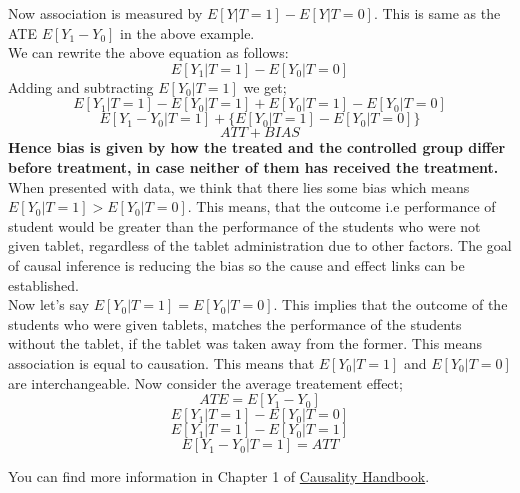 \documentclass{article}
\begin{document}
Now association is measured by $E[Y | T = 1] - E[Y | T = 0]$. This is same as the ATE $E[Y_1 - Y_0]$ in the above example.\\
We can rewrite the above equation as follows:\\
$$E[Y_1 | T = 1] - E[Y_0 | T = 0]$$
Adding and subtracting $E[Y_0 | T = 1]$ we get;\\
$$E[Y_1 | T = 1] - E[Y_0 | T = 1] + E[Y_0 | T = 1] - E[Y_0 | T = 0]$$
$$E[Y_1 - Y_0 | T = 1] + \{E[Y_0 | T = 1] - E[Y_0 | T = 0]\}$$
$$ATT + BIAS$$
\textbf{Hence bias is given by how the treated and the controlled group differ before treatment, in case neither of them has received the treatment.}\\
When presented with data, we think that there lies some bias which means $E[Y_0 | T = 1] > E[Y_0 | T = 0]$. This means, that
the outcome i.e performance of student would be greater than the performance of the students who were not given tablet, regardless of the tablet 
administration due to other factors. The goal of causal inference is reducing the bias so the cause and effect links can be established.\\
Now let's say $E[Y_0 | T = 1] = E[Y_0 | T = 0]$. This implies that the outcome of the students who were given tablets,
matches the performance of the students without the tablet, if the tablet was taken away from the former. This means association is equal to causation.
This means that $E[Y_0 | T = 1]$ and $E[Y_0 | T = 0]$ are interchangeable. Now consider the average treatement effect;\\
$$ATE = E[Y_1 - Y_0]$$
$$E[Y_1 | T = 1] - E[Y_0 | T = 0]$$
$$E[Y_1 | T = 1] - E[Y_0 | T = 1]$$
$$E[Y_1 - Y_0 | T = 1] = ATT$$

You can find more information in Chapter 1 of \href{https://matheusfacure.github.io/python-causality-handbook/01-Introduction-To-Causality.html}{Causality Handbook}.
\end{document}
